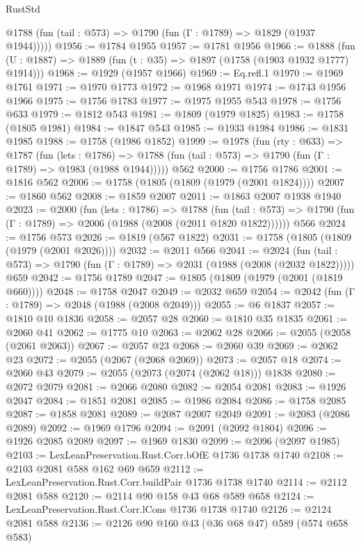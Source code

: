 \begin{lexlean}{RustStd}
\begin{coremodule}
      @1788 (fun (tail : @573) => @1790 (fun (Γ : @1789) => @1829 (@1937 @1944)))))
@1956 := @1784 @1955
@1957 := @1781 @1956
@1966 := @1888 (fun (U : @1887) => @1889 (fun (t : @35) => @1897 (@1758 (@1903 @1932 @1777) @1914)))
@1968 := @1929 (@1957 @1966)
@1969 := Eq.refl.{1}
@1970 := @1969 @1761
@1971 := @1970 @1773
@1972 := @1968 @1971
@1974 := @1743 @1956 @1966
@1975 := @1756 @1783
@1977 := @1975 @1955 @543
@1978 := @1756 @633
@1979 := @1812 @543
@1981 := @1809 (@1979 @1825)
@1983 := @1758 (@1805 @1981)
@1984 := @1847 @543
@1985 := @1933 @1984
@1986 := @1831 @1985
@1988 := @1758 (@1986 @1852)
@1999 := @1978
    (fun (rty : @633) =>
    @1787
      (fun (lets : @1786) =>
      @1788 (fun (tail : @573) => @1790 (fun (Γ : @1789) => @1983 (@1988 @1944)))))
    @562
@2000 := @1756 @1786
@2001 := @1816 @562
@2006 := @1758 (@1805 (@1809 (@1979 (@2001 @1824))))
@2007 := @1860 @562
@2008 := @1859 @2007
@2011 := @1863 @2007 @1938 @1940
@2023 := @2000
    (fun (lets : @1786) =>
    @1788
      (fun (tail : @573) => @1790 (fun (Γ : @1789) => @2006 (@1988 (@2008 (@2011 @1820 @1822))))))
    @566
@2024 := @1756 @573
@2026 := @1819 (@567 @1822)
@2031 := @1758 (@1805 (@1809 (@1979 (@2001 @2026))))
@2032 := @2011 @566
@2041 := @2024
    (fun (tail : @573) => @1790 (fun (Γ : @1789) => @2031 (@1988 (@2008 (@2032 @1822)))))
    @659
@2042 := @1756 @1789
@2047 := @1805 (@1809 (@1979 (@2001 (@1819 @660))))
@2048 := @1758 @2047
@2049 := @2032 @659
@2054 := @2042 (fun (Γ : @1789) => @2048 (@1988 (@2008 @2049)))
@2055 := @6 @1837
@2057 := @1810 @10 @1836
@2058 := @2057 @28
@2060 := @1810 @35 @1835
@2061 := @2060 @41
@2062 := @1775 @10
@2063 := @2062 @28
@2066 := @2055 (@2058 (@2061 @2063))
@2067 := @2057 @23
@2068 := @2060 @39
@2069 := @2062 @23
@2072 := @2055 (@2067 (@2068 @2069))
@2073 := @2057 @18
@2074 := @2060 @43
@2079 := @2055 (@2073 (@2074 (@2062 @18))) @1838
@2080 := @2072 @2079
@2081 := @2066 @2080
@2082 := @2054 @2081
@2083 := @1926 @2047
@2084 := @1851 @2081
@2085 := @1986 @2084
@2086 := @1758 @2085
@2087 := @1858 @2081
@2089 := @2087 @2007 @2049
@2091 := @2083 (@2086 @2089)
@2092 := @1969 @1796
@2094 := @2091 (@2092 @1804)
@2096 := @1926 @2085 @2089
@2097 := @1969 @1830
@2099 := @2096 (@2097 @1985)
@2103 := LexLeanPreservation.Rust.Corr.bOfE @1736 @1738 @1740
@2108 := @2103 @2081 @588 @162 @69 @659
@2112 := LexLeanPreservation.Rust.Corr.buildPair @1736 @1738 @1740
@2114 := @2112 @2081 @588
@2120 := @2114 @90 @158 @43 @68 @589 @658
@2124 := LexLeanPreservation.Rust.Corr.lCons @1736 @1738 @1740
@2126 := @2124 @2081 @588
@2136 := @2126 @90 @160 @43 (@36 @68 @47) @589 (@574 @658 @583)

\end{coremodule}
\end{lexlean}

